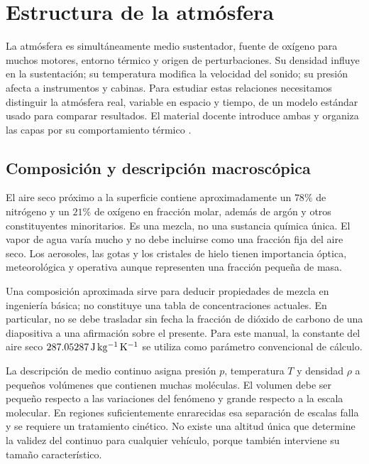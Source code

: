 \chapter{Estructura de la atmósfera}\label{ch:03}

La atmósfera es simultáneamente medio sustentador, fuente de oxígeno para muchos motores, entorno térmico y origen de perturbaciones. Su densidad influye en la sustentación; su temperatura modifica la velocidad del sonido; su presión afecta a instrumentos y cabinas. Para estudiar estas relaciones necesitamos distinguir la atmósfera real, variable en espacio y tiempo, de un modelo estándar usado para comparar resultados. El material docente introduce ambas y organiza las capas por su comportamiento térmico \cite{TAE2}.

\section{Composición y descripción macroscópica}
El aire seco próximo a la superficie contiene aproximadamente un $78\%$ de nitrógeno y un $21\%$ de oxígeno en fracción molar, además de argón y otros constituyentes minoritarios. Es una mezcla, no una sustancia química única. El vapor de agua varía mucho y no debe incluirse como una fracción fija del aire seco. Los aerosoles, las gotas y los cristales de hielo tienen importancia óptica, meteorológica y operativa aunque representen una fracción pequeña de masa.

Una composición aproximada sirve para deducir propiedades de mezcla en ingeniería básica; no constituye una tabla de concentraciones actuales. En particular, no se debe trasladar sin fecha la fracción de dióxido de carbono de una diapositiva a una afirmación sobre el presente. Para este manual, la constante del aire seco $287.05287\,\mathrm{J\,kg^{-1}\,K^{-1}}$ se utiliza como parámetro convencional de cálculo.

La descripción de medio continuo asigna presión $p$, temperatura $T$ y densidad $\rho$ a pequeños volúmenes que contienen muchas moléculas. El volumen debe ser pequeño respecto a las variaciones del fenómeno y grande respecto a la escala molecular. En regiones suficientemente enrarecidas esa separación de escalas falla y se requiere un tratamiento cinético. No existe una altitud única que determine la validez del continuo para cualquier vehículo, porque también interviene su tamaño característico.

